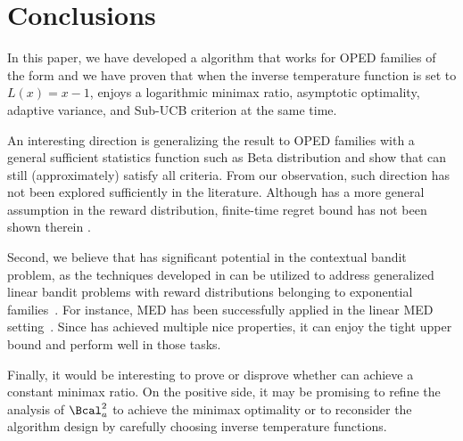 \section{Conclusions}
In this paper, we have developed a \gexpklms algorithm that works for OPED families of the form  and we have proven that when the inverse temperature function is set to $L(x) = x - 1$, \expklms enjoys a logarithmic minimax ratio, asymptotic optimality, adaptive variance, and Sub-UCB criterion at the same time.

An interesting direction is generalizing the result to OPED families with a general sufficient statistics function such as Beta distribution and show that \gexpklms can still (approximately) satisfy all criteria. From our observation, such direction has not been explored sufficiently in the literature.
Although \citet{baudry2023general} has a more general assumption in the reward distribution, finite-time regret bound has not been shown therein \citet{baudry2023general}.

Second, we believe that \expklms has significant potential in the contextual bandit problem, as the techniques developed in \expklms can be utilized to address generalized linear bandit problems with reward distributions belonging to exponential families~\citep{filippi10parametric}. For instance, MED has been successfully applied in the linear MED setting~\citep{balagopalan2024minimum}. Since \expklms has achieved multiple nice properties, it can enjoy the tight upper bound and perform well in those tasks. 

Finally, it would be interesting to prove or disprove whether \expklms can achieve a constant minimax ratio. On the positive side, it may be promising to refine the analysis of $\Bcal^2_a$ to achieve the minimax optimality or to reconsider the algorithm design by carefully choosing inverse temperature functions.
